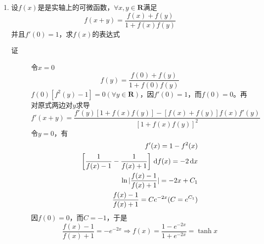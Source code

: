 \begin{enumerate}
\item 设$f(x)$是是实轴上的可微函数，$\forall x,y \in \mathbf{R}$满足
\[
f(x+y)=\frac{f(x)+f(y)}{1+f(x)f(y)}
\]
并且$f'(0)=1$，求$f(x)$的表达式
\begin{description}
\item[证] 令$x=0$
\[
f(y)=\frac{f(0)+f(y)}{1+f(0)f(y)}
\]
$f(0)[f^2(y)-1]=0(\forall y \in \mathbf{R})$，因$f'(0)=1$，而$f(0)=0$。再对原式两边对$y$求导
\[
f'(x+y)=\frac{f'(y)[1+f(x)f(y)]-[f(x)+f(y)]f(x)f'(y)}{[1+f(x)f(y)]^2}
\]
令$y=0$，有
\begin{eqnarray*}
f'(x)=1-f^2(x)\\
\left[\frac{1}{f(x)-1} -\frac{1}{f(x)+1} \right]\,\mathrm{d} f(x)=-2\,\mathrm{d} x\\
\ln|\frac{f(x)-1}{f(x)+1}|=-2x+C_1\\
\frac{f(x)-1}{f(x)+1} = Ce^{-2x}(C=e^{C_1})
\end{eqnarray*}
因$f(0)=0$，而$C=-1$，于是
\[
\frac{f(x)-1}{f(x)+1} = -e^{-2x} \Rightarrow f(x)=\frac{1-e^{-2x}}{1+e^{-2x}}=\tanh x
\]
\end{description}

















\end{enumerate}
